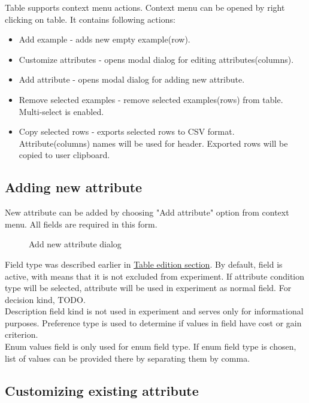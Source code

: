 Table supports context menu actions. Context menu can be opened by right clicking on table. It contains following actions:
\begin{itemize}
	\item Add example - adds new empty example(row).
	\item Customize attributes - opens modal dialog for editing attributes(columns).
	\item Add attribute - opens modal dialog for adding new attribute.
	\item Remove selected examples - remove selected examples(rows) from table. Multi-select is enabled.
	\item Copy selected rows - exports selected rows to CSV format. Attribute(columns) names will be used for header. Exported rows will be copied to user clipboard.
\end{itemize}

\subsection{Adding new attribute}\label{sub:isf-add-attr}

New attribute can be added by choosing "Add attribute" option from context menu. All fields are required in this form.

\begin{figure*}[!ht] 
	\centering
	\caption{Add new attribute dialog}
\end{figure*}

Field type was described earlier in \hyperref[sub:isf-examples]{Table edition section}. By default, field is active, with means that it is not excluded from experiment.
If attribute condition type will be selected, attribute will be used in experiment as normal field. For decision kind, TODO.\\ Description field kind is not used in experiment and serves only for informational purposes. Preference type is used to determine if values in field have cost or gain criterion.\\
Enum values field is only used for enum field type. If enum field type is chosen, list of values can be provided there by separating them by comma.

\subsection{Customizing existing attribute}\label{sub:isf-cust-attr}

